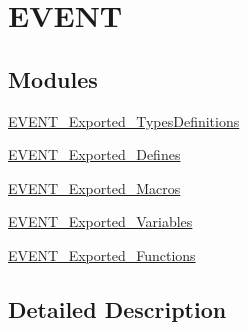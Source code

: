 \hypertarget{group___e_v_e_n_t}{}\section{E\+V\+E\+NT}
\label{group___e_v_e_n_t}
\subsection*{Modules}
\begin{DoxyCompactItemize}
\item 
\mbox{\hyperlink{group___e_v_e_n_t___exported___types_definitions}{E\+V\+E\+N\+T\+\_\+\+Exported\+\_\+\+Types\+Definitions}}
\item 
\mbox{\hyperlink{group___e_v_e_n_t___exported___defines}{E\+V\+E\+N\+T\+\_\+\+Exported\+\_\+\+Defines}}
\item 
\mbox{\hyperlink{group___e_v_e_n_t___exported___macros}{E\+V\+E\+N\+T\+\_\+\+Exported\+\_\+\+Macros}}
\item 
\mbox{\hyperlink{group___e_v_e_n_t___exported___variables}{E\+V\+E\+N\+T\+\_\+\+Exported\+\_\+\+Variables}}
\item 
\mbox{\hyperlink{group___e_v_e_n_t___exported___functions}{E\+V\+E\+N\+T\+\_\+\+Exported\+\_\+\+Functions}}
\end{DoxyCompactItemize}


\subsection{Detailed Description}
